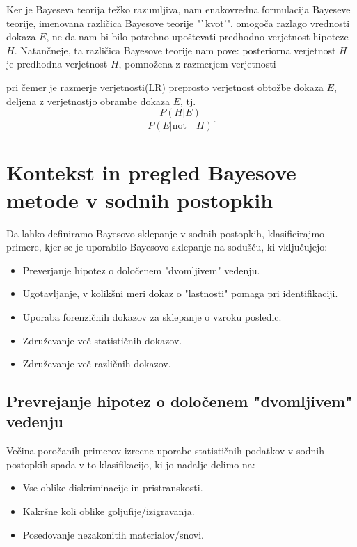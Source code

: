 \documentclass[a4paper,12pt]{article}
\begin{document}
Ker je Bayeseva teorija težko razumljiva, nam enakovredna formulacija Bayeseve teorije, imenovana različica Bayesove teorije "`kvot'", 
omogoča razlago vrednosti dokaza $E$, ne da nam bi bilo potrebno upoštevati predhodno verjetnost hipoteze $H$. Natančneje, ta različica 
Bayesove teorije nam pove:\vspace{5mm}
posteriorna verjetnost $H$ je predhodna verjetnost $H$, pomnožena z razmerjem verjetnosti  
\vspace{5mm}

pri čemer je razmerje verjetnosti(LR) preprosto verjetnost obtožbe dokaza $E$, deljena z verjetnostjo obrambe dokaza $E$, tj.
\[\frac{P(H \lvert E)}{P(E \lvert \text{not} \quad H)}.\]

\section{Kontekst in pregled Bayesove metode v sodnih postopkih}
Da lahko definiramo Bayesovo sklepanje v sodnih postopkih, klasificirajmo primere, kjer se je uporabilo Bayesovo sklepanje na sodušču, 
ki vključujejo:
\begin{itemize}
    \item Preverjanje hipotez o določenem "dvomljivem" vedenju.
    \item Ugotavljanje, v kolikšni meri dokaz o "lastnosti" pomaga pri identifikaciji.
    \item Uporaba forenzičnih dokazov za sklepanje o vzroku posledic.
    \item Združevanje več statističnih dokazov.
    \item Združevanje več različnih dokazov.
\end{itemize}

\subsection{Prevrejanje hipotez o določenem "dvomljivem" vedenju}
Večina poročanih primerov izrecne uporabe statističnih podatkov v sodnih postopkih spada v to klasifikacijo, ki jo nadalje delimo na:
\begin{itemize}
    \item Vse oblike diskriminacije in pristranskosti.
    \item Kakršne koli oblike goljufije/izigravanja.
    \item Posedovanje nezakonitih materialov/snovi.
\end{itemize}
\end{document}
